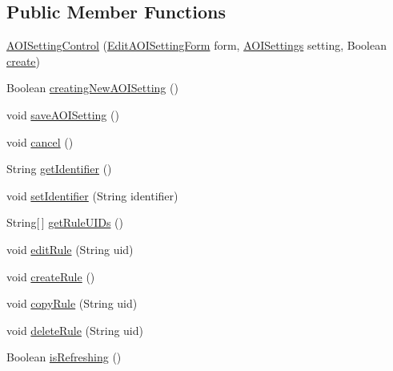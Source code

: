 \subsection*{Public Member Functions}
\begin{DoxyCompactItemize}
\item 
\hyperlink{class_web_analyzer_1_1_u_i_1_1_interaction_objects_1_1_a_o_i_setting_control_aba590b033948b15906956ea0314f6e46}{A\+O\+I\+Setting\+Control} (\hyperlink{class_web_analyzer_1_1_u_i_1_1_edit_a_o_i_setting_form}{Edit\+A\+O\+I\+Setting\+Form} form, \hyperlink{class_web_analyzer_1_1_models_1_1_settings_model_1_1_a_o_i_settings}{A\+O\+I\+Settings} setting, Boolean \hyperlink{_u_i_2_h_t_m_l_resources_2js_2lib_2underscore_8min_8js_a8bd5981157799459d39a59e8c4a0de04}{create})
\item 
Boolean \hyperlink{class_web_analyzer_1_1_u_i_1_1_interaction_objects_1_1_a_o_i_setting_control_a298902c1d52470da4a0141819e55eb4d}{creating\+New\+A\+O\+I\+Setting} ()
\item 
void \hyperlink{class_web_analyzer_1_1_u_i_1_1_interaction_objects_1_1_a_o_i_setting_control_a7d895c94dcd8a3c65249aa6721ae81c8}{save\+A\+O\+I\+Setting} ()
\item 
void \hyperlink{class_web_analyzer_1_1_u_i_1_1_interaction_objects_1_1_a_o_i_setting_control_a2c0ef2d343a35ab51285bf4f1f782a18}{cancel} ()
\item 
String \hyperlink{class_web_analyzer_1_1_u_i_1_1_interaction_objects_1_1_a_o_i_setting_control_af075fa96759a677d9e973b26778981cf}{get\+Identifier} ()
\item 
void \hyperlink{class_web_analyzer_1_1_u_i_1_1_interaction_objects_1_1_a_o_i_setting_control_a8224c2f4018a9df0dd8f485b45207844}{set\+Identifier} (String identifier)
\item 
String\mbox{[}$\,$\mbox{]} \hyperlink{class_web_analyzer_1_1_u_i_1_1_interaction_objects_1_1_a_o_i_setting_control_a62223cb7bae2345f6304940012519c04}{get\+Rule\+U\+I\+Ds} ()
\item 
void \hyperlink{class_web_analyzer_1_1_u_i_1_1_interaction_objects_1_1_a_o_i_setting_control_a08b6ee8feecd8783252291abdcc7e23e}{edit\+Rule} (String uid)
\item 
void \hyperlink{class_web_analyzer_1_1_u_i_1_1_interaction_objects_1_1_a_o_i_setting_control_ad6d4cbe37d7d49b7b9a7e270fd2ad52b}{create\+Rule} ()
\item 
void \hyperlink{class_web_analyzer_1_1_u_i_1_1_interaction_objects_1_1_a_o_i_setting_control_a9dbae7bde830b8c7ad1f6b08c7af4235}{copy\+Rule} (String uid)
\item 
void \hyperlink{class_web_analyzer_1_1_u_i_1_1_interaction_objects_1_1_a_o_i_setting_control_a137a5cbb5cb6d5de541a9ceba0a8e570}{delete\+Rule} (String uid)
\item 
Boolean \hyperlink{class_web_analyzer_1_1_u_i_1_1_interaction_objects_1_1_a_o_i_setting_control_afffc79796fc0881696d98f6b3e24bfc7}{is\+Refreshing} ()
\end{DoxyCompactItemize}
